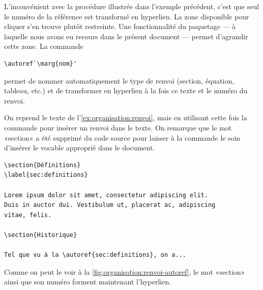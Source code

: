 L'inconvénient avec la procédure illustrée dans l'exemple précédent,
c'est que seul le numéro de la référence est transformé en hyperlien.
La zone disponible pour cliquer s'en trouve plutôt restreinte. Une
fonctionnalité du paquetage  --- à laquelle nous avons eu
recours dans le présent document --- permet d'agrandir cette zone. La
commande
\begin{lstlisting}
\autoref`\marg{nom}'
\end{lstlisting}
permet de nommer automatiquement le type de renvoi (section, équation,
tableau, etc.) et de transformer en hyperlien à la fois ce texte et le
numéro du renvoi.

\begin{exemple}
  \label{ex:organisation:renvoi-autoref}
  On reprend le texte de l'\autoref{ex:organisation:renvoi}, mais en
  utilisant cette fois la commande \cmd{\autoref} pour insérer un
  renvoi dans le texte. On remarque que le mot «section» a été
  supprimé du code source pour laisser à la commande le soin d'insérer
  le vocable approprié dans le document.
\begin{lstlisting}[emph={\label,\autoref}]
\section{Définitions}
\label{sec:definitions}

Lorem ipsum dolor sit amet, consectetur adipiscing elit.
Duis in auctor dui. Vestibulum ut, placerat ac, adipiscing
vitae, felis.

\section{Historique}

Tel que vu à la \autoref{sec:definitions}, on a...
\end{lstlisting}
  Comme on peut le voir à la
  \autoref{fig:organisation:renvoi-autoref}, le mot «section» ainsi
  que son numéro forment maintenant l'hyperlien.


\end{exemple}
